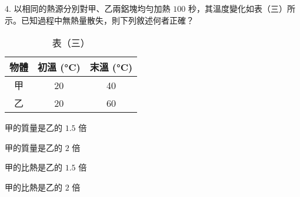 \documentclass[12pt]{article}
\begin{document}
\begin{problem}
  \item[4.] 以相同的熱源分別對甲、乙兩鋁塊均勻加熱 $100$ 秒，其溫度變化如表（三）所示。已知過程中無熱量散失，則下列敘述何者正確？
  \begin{table}[ht]
    \centering
    \renewcommand{\arraystretch}{1.2}
    \vspace*{-1ex}
    \caption*{表（三）}
    \vspace*{-1ex}
    \begin{tabular}{|c|c|c|}
      \hline
      物體 & 初溫 (\unit{\degreeCelsius}) & 末溫 (\unit{\degreeCelsius}) \\ \hline
      甲 & 20 & 40 \\ \hline
      乙 & 20 & 60 \\ \hline
    \end{tabular}
    \vspace*{-2ex}
  \end{table}
  \begin{choices}
    \item 甲的質量是乙的 $1.5$ 倍
    \item 甲的質量是乙的 $2$ 倍
    \item 甲的比熱是乙的 $1.5$ 倍
    \item 甲的比熱是乙的 $2$ 倍
  \end{choices}
\end{problem}
\end{document}
